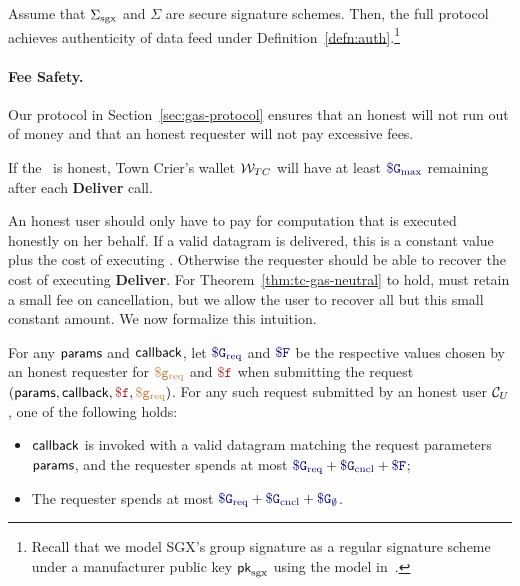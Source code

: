\vspace{2mm}
\begin{theorem}[Authenticity]
\label{thm:authenticity}
Assume that ${\Sigma_{\textrm{sgx}}}$
and $\Sigma$ are secure signature schemes.
Then, the full \tc
protocol achieves authenticity of data feed under Definition~\ref{defn:auth}.\footnote{Recall
that we
model SGX's group signature as a regular signature
scheme under a manufacturer public key ${\sf pk}_{\mathrm{sgx}}$ using the model in~\cite{sgxsok}.}
\end{theorem}




\paragraph{Fee Safety.}
Our protocol in Section~\ref{sec:gas-protocol} ensures that an honest \tcs will not run out of money
and that an honest requester will not pay excessive fees.

\begin{theorem}
\label{thm:tc-gas-neutral}
If the \tc~\medname is honest,
Town Crier's wallet ${\cal W}_{TC}$ will have at least $\constgasmax$ remaining after each {\bf Deliver} call.
\end{theorem}

An honest user should only have to pay for computation that is executed honestly on her behalf.
If a valid datagram is delivered, this is a constant value plus the cost of executing \dgcallback.
Otherwise the requester should be able to recover the cost of executing {\bf Deliver}.
For Theorem~\ref{thm:tc-gas-neutral} to hold, \tcont must retain a small fee on cancellation,
but we allow the user to recover all but this small constant amount.
We now formalize this intuition.

\begin{theorem}
\label{thm:fair-expenditure}
For any ${\sf params}$ and ${\sf callback}$,
let $\constgasrequest$ and $\consthonestfee$ be the respective values chosen by an honest requester for $\textcolor{brown}{\tt \$g_\text{req}}$ and $\fee$
when submitting the request $(\dgform, \dgcallback, \fee, \gasrequest)$.
For any such request submitted by an honest user ${\cal C}_U$, one of the following holds:
\begin{itemize}
  \setlength{\itemsep}{2pt}
  \setlength{\parskip}{0pt}
  \setlength{\parsep}{0pt}
  \item ${\sf callback}$ is invoked with a valid datagram matching the request parameters ${\sf params}$,
    and the requester spends at most $\constgasrequest + \constgasinvokecancel + \consthonestfee$;

  \item The requester spends at most $\constgasrequest + \constgasinvokecancel + \constgascancel$.
\end{itemize}
\end{theorem}





